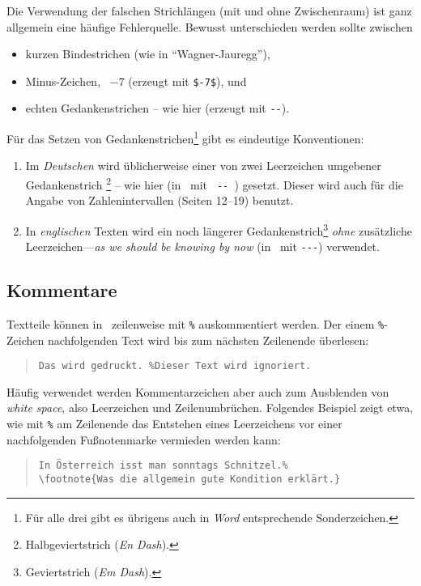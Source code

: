 Die Verwendung der falschen Strichlängen (mit und ohne
Zwischenraum) ist ganz allgemein eine häufige Fehlerquelle.
Bewusst unterschieden werden sollte zwischen
%
\begin{itemize}
\item kurzen Bindestrichen (wie in "`Wagner-Jauregg"'), %
\item Minus-Zeichen, \zB\ $-7$ (erzeugt mit \verb!$-7$!), und %
\item echten Gedankenstrichen -- wie hier (erzeugt mit \verb!--!).
\end{itemize}
%
\noindent Für das Setzen von Gedankenstrichen\footnote{Für alle
drei gibt es übrigens auch in \emph{Word} entsprechende
Sonderzeichen.} gibt es eindeutige Konventionen:
%
\begin{enumerate}
\item Im \emph{Deutschen} wird üblicherweise einer von zwei
Leerzeichen umgebener Gedankenstrich%
\footnote{Halbgeviertstrich (\emph{En Dash}).} -- wie hier (in
\latex\ mit {\verb*! -- !}) gesetzt. Dieser wird auch für die Angabe von
Zahlenintervallen (Seiten 12--19) benutzt. 
%
\item In \emph{englischen} Texten wird ein noch längerer
Gedankenstrich\footnote{Geviertstrich (\emph{Em Dash}).} \emph{ohne}
zusätzliche Leerzeichen---\emph{as we should be knowing by now}
(in \latex\ mit {\verb*!---!}) verwendet.
%
\end{enumerate}




\subsection{Kommentare}
\label{sec:kommentare}


Textteile können in \latex\ zeilenweise mit \verb!%! auskommentiert werden. Der einem 
\verb!%!-Zeichen nachfolgenden Text wird bis zum nächsten Zeilenende überlesen:
%
\begin{quote}
\verb!Das wird gedruckt. %Dieser Text wird ignoriert.!
\end{quote}
%
Häufig verwendet werden Kommentarzeichen aber auch zum Ausblenden von 
\emph{white space}, also Leerzeichen und Zeilenumbrüchen.
Folgendes Beispiel zeigt etwa, wie mit \verb!%! am Zeilenende das Entstehen
eines Leerzeichens vor einer nachfolgenden Fußnotenmarke vermieden werden kann:
%
\begin{quote}
\begin{verbatim}
In Österreich isst man sonntags Schnitzel.%
\footnote{Was die allgemein gute Kondition erklärt.}
\end{verbatim}
\end{quote}
%

